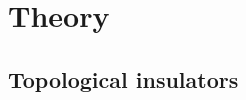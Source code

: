 \documentclass[english, a4, 12pt]{scrartcl}
\begin{document}
%	
%	
%	
%	
	
\FloatBarrier
\section{Theory}
	\subsection{Topological insulators}
	 \label{topological_insulator}
	
\end{document}
